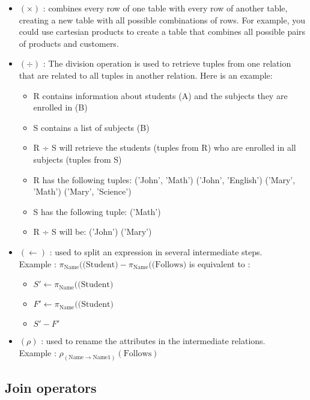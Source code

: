 \begin{itemize}
    \item {} $(\times)$ : combines every row of one table with every row of another table, creating a new table with all possible combinations of rows. For example, you could use cartesian products to create a table that combines all possible pairs of products and customers.
    \item {} $(\div)$ : The division operation is used to retrieve tuples from one relation that are related to all tuples in another relation. Here is an example:
        \begin{itemize}
            \item R contains information about students (A) and the subjects they are enrolled in (B)
            \item S contains a list of subjects (B)
            \item R ÷ S will retrieve the students (tuples from R) who are enrolled in all subjects (tuples from S)
            \item R has the following tuples: ('John', 'Math') ('John', 'English') ('Mary', 'Math') ('Mary', 'Science')
            \item S has the following tuple: ('Math')
            \item R ÷ S will be: ('John') ('Mary')
        \end{itemize}
    \item {} $(\leftarrow)$ : used to split an expression in several intermediate steps.\\Example : $\pi_{\text{Name}}(\text{(Student)} - \pi_{\text{Name}}(\text{(Follows)}$ is equivalent to :
        \begin{itemize}
            \item $S' \leftarrow \pi_{\text{Name}}(\text{(Student)}$
            \item $F' \leftarrow \pi_{\text{Name}}(\text{(Student)}$
            \item $S' - F'$
        \end{itemize}
    \item {} $(\rho)$ : used to rename the attributes in the intermediate relations.\\Example : $\rho_{(\text{Name} \rightarrow \text{Name1})}(\text{Follows})$
\end{itemize}

\subsection{Join operators}

